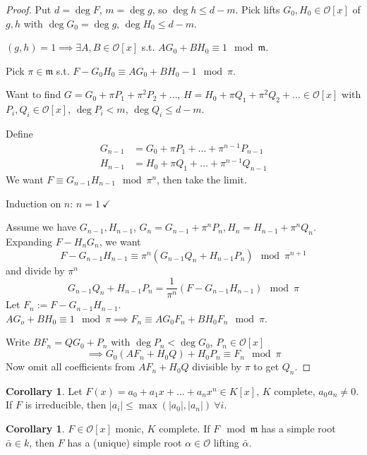 \documentclass[a4paper]{article}
\theoremstyle{definition}
\theoremstyle{default}
\newtheorem{corollary}[definition]{Corollary}
\theoremstyle{remark}
\newcommand*\abs[1]{\left|#1\right|}
\begin{document}
\begin{proof}
	Put $d = \deg F$, $m = \deg g$, so $\deg h \leq d-m$.
	Pick lifts $G_0, H_0 \in \mathcal{O}[x]$ of $g, h$ with $\deg G_0 = \deg g$, $\deg H_0 \leq d-m$.
	
	$(g, h) = 1 \implies \exists A, B \in \mathcal{O}[x]$ s.t. $AG_0 + BH_0 \equiv 1 \mod \mathfrak{m}$.
	
	Pick $\pi \in \mathfrak{m}$ s.t. $F-G_0H_0 \equiv AG_0+BH_0-1 \mod \pi$.
	
	Want to find $G = G_0 + \pi P_1 + \pi^2 P_2 + \dots$, $H = H_0 + \pi Q_1 + \pi^2 Q_2 + \dots \in \mathcal{O}[x]$ with $P_i, Q_i \in \mathcal{O}[x]$, $\deg P_i < m$, $\deg Q_i \leq d-m$.
	
	Define
	\begin{align*}
		G_{n-1} &= G_0 + \pi P_1 + \dots + \pi^{n-1}P_{n-1}\\
		H_{n-1} &= H_0 + \pi Q_1 + \dots + \pi^{n-1}Q_{n-1}
	\end{align*}
	We want $F \equiv G_{n-1}H_{n-1} \mod \pi^n$, then take the limit.
	
	Induction on $n$: $n = 1\ \checkmark$
	
	Assume we have $G_{n-1}, H_{n-1}$,
	$G_n = G_{n-1}+\pi^nP_n, H_n = H_{n-1} + \pi^n Q_n$.
	Expanding $F-H_nG_n$, we want $$F-G_{n-1}H_{n-1} \equiv \pi^n(G_{n-1}Q_n + H_{n-1}P_n) \mod \pi^{n+1}$$ and divide by $\pi^n$
	$$G_{n-1}Q_n + H_{n-1}P_n = \frac{1}{\pi^n}\left(F-G_{n-1}H_{n-1}\right) \mod \pi$$
	Let $F_n := F-G_{n-1}H_{n-1}$.
	$AG_o + BH_0 \equiv 1 \mod \pi \implies F_n \equiv AG_0F_n + BH_0F_n \mod \pi$.
	
	Write $BF_n = QG_0 + P_n$ with $\deg P_n < \deg G_0$, $P_n \in \mathcal{O}[x]$ $$\implies G_0(AF_n + H_0Q) + H_0P_n \equiv F_n \mod \pi$$ Now omit all coefficients from $AF_n+H_0Q$ divisible by $\pi$ to get $Q_n$.
\end{proof}

\begin{corollary}
	Let $F(x)=a_0 + a_1 x + \dots + a_n x^n \in K[x]$, $K$ complete,
	$a_0a_n \neq 0$. If $F$ is irreducible,
	then $\abs{a_i} \leq \max(\abs{a_0}, \abs{a_n})\ \forall i$.
\end{corollary}

\begin{corollary}
	$F \in \mathcal{O}[x]$ monic, $K$ complete.
	If $F \mod \mathfrak{m}$ has a simple root $\bar{\alpha} \in k$,
	then $F$ has a (unique) simple root $\alpha \in \mathcal{O}$ lifting $\bar{\alpha}$.
\end{corollary}
\end{document}
